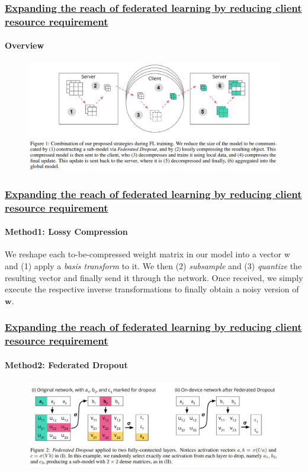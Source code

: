 \documentclass[10pt]{beamer}
\begin{document}
    \begin{frame}
        \frametitle{
            \href{https://arxiv.org/pdf/1812.07210.pdf}{
            Expanding the reach of federated learning by reducing client resource requirement
            }
        }

        \framesubtitle{
            Overview 
        }

        \begin{figure}
            \includegraphics[width=\textwidth]{src/img/RCRRStructure.JPG}
        \end{figure}


    \end{frame}

    \begin{frame}
        \frametitle{
            \href{https://arxiv.org/pdf/1812.07210.pdf}{
            Expanding the reach of federated learning by reducing client resource requirement
            }
        }

        \framesubtitle{
            Method1: Lossy Compression 
        }

        We reshape each to-be-compressed weight matrix in our model into a vector w and (1) apply a \textit{basis transform} to it. We then (2) \textit{subsample} and (3) \textit{quantize} the resulting vector and finally send it through the network. Once received, we simply execute the respective inverse transformations to finally obtain a noisy version of $ \textbf{w} $.


    \end{frame}

    \begin{frame}
        \frametitle{
            \href{https://arxiv.org/pdf/1812.07210.pdf}{
            Expanding the reach of federated learning by reducing client resource requirement
            }
        }

        \framesubtitle{
            Method2: Federated Dropout 
        }

        \begin{figure}
            \includegraphics[width=\textwidth]{src/img/FedDropout.JPG}
        \end{figure}
    \end{frame}
\end{document}

